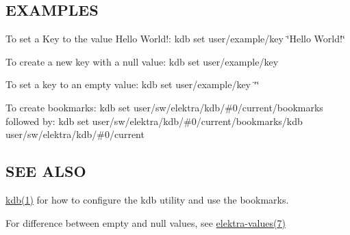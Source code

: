 \subsection*{E\+X\+A\+M\+P\+L\+E\+S}

To set a Key to the value {\ttfamily Hello World!}\+: {\ttfamily kdb set user/example/key \char`\"{}\+Hello World!\char`\"{}}

To create a new key with a null value\+: {\ttfamily kdb set user/example/key}

To set a key to an empty value\+: {\ttfamily kdb set user/example/key \char`\"{}\char`\"{}}

To create bookmarks\+: {\ttfamily kdb set user/sw/elektra/kdb/\#0/current/bookmarks} followed by\+: {\ttfamily kdb set user/sw/elektra/kdb/\#0/current/bookmarks/kdb user/sw/elektra/kdb/\#0/current}

\subsection*{S\+E\+E A\+L\+S\+O}


\begin{DoxyItemize}
\item \hyperlink{md_doc_help_kdb_doc_help_kdb_md}{kdb(1)} for how to configure the kdb utility and use the bookmarks.
\item For difference between empty and null values, see \hyperlink{md_doc_help_elektra-values_doc_help_elektra-values_md}{elektra-\/values(7)} 
\end{DoxyItemize}
